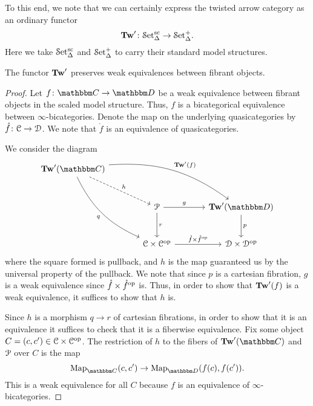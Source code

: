 \documentclass[main.tex]{subfiles}
\begin{document}
To this end, we note that we can certainly express the twisted arrow category as an ordinary functor
\begin{equation*}
  \mathbf{Tw}'\colon \mathcal{S}\mathrm{et}_{\Delta}^{\mathrm{sc}} \to \mathcal{S}\mathrm{et}_{\Delta}^{+}.
\end{equation*}
Here we take $\mathcal{S}\mathrm{et}_{\Delta}^{\mathrm{sc}}$ and $\mathcal{S}\mathrm{et}_{\Delta}^{+}$ to carry their standard model structures.

\begin{lemma}
  The functor $\mathbf{Tw}'$ preserves weak equivalences between fibrant objects.
\end{lemma}
\begin{proof}
  Let $f\colon \CC \to \DD$ be a weak equivalence between fibrant objects in the scaled model structure. Thus, $f$ is a bicategorical equivalence between $\infty$-bicategories. Denote the map on the underlying quasicategories by $\mathring{f}\colon \mathcal{C} \to \mathcal{D}$. We note that $\mathring{f}$ is an equivalence of quasicategories.

  We consider the diagram
  \begin{equation*}
    \begin{tikzcd}[row sep=large, column sep=large]
      \Tw'(\CC)
      \arrow[drr, bend left=20, "\Tw'(f)"]
      \arrow[ddr, bend right=20, swap, "q"]
      \arrow[dr, dashed, "h"]
      \\
      & \mathcal{P}
      \arrow[r, "g"]
      \arrow[d, "r"]
      & \Tw'(\DD)
      \arrow[d, "p"]
      \\
      & \category{C} \times \category{C}\op
      \arrow[r, "\mathring{f} \times \mathring{f}\op"]
      & \category{D} \times \category{D}\op
    \end{tikzcd}
  \end{equation*}
  where the square formed is pullback, and $h$ is the map guaranteed us by the universal property of the pullback. We note that since $p$ is a cartesian fibration, $g$ is a weak equivalence since $\mathring{f} \times \mathring{f}^{\mathrm{op}}$ is. Thus, in order to show that $\mathbf{Tw}'(f)$ is a weak equivalence, it suffices to show that $h$ is.

  Since $h$ is a morphism $q \to r$ of cartesian fibrations, in order to show that it is an equivalence it suffices to check that it is a fiberwise equivalence. Fix some object $C = (c, c') \in \mathcal{C} \times \mathcal{C}^{\mathrm{op}}$. The restriction of $h$ to the fibers of $\Tw'(\CC)$ and $\mathcal{P}$ over $C$ is the map
  \begin{equation*}
    \Map_{\CC}(c, c') \to \Map_{\DD}(f(c), f(c')).
  \end{equation*}
  This is a weak equivalence for all $C$ because $f$ is an equivalence of $\infty$-bicategories.
\end{proof}
\end{document}
